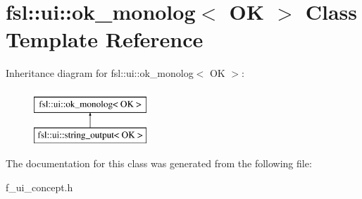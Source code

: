 \hypertarget{classfsl_1_1ui_1_1ok__monolog}{}\section{fsl\+::ui\+::ok\+\_\+monolog$<$ OK $>$ Class Template Reference}
\label{classfsl_1_1ui_1_1ok__monolog}
Inheritance diagram for fsl\+::ui\+::ok\+\_\+monolog$<$ OK $>$\+:\begin{figure}[H]
\begin{center}
\leavevmode
\includegraphics[height=2.000000cm]{classfsl_1_1ui_1_1ok__monolog}
\end{center}
\end{figure}


The documentation for this class was generated from the following file\+:\begin{DoxyCompactItemize}
\item 
f\+\_\+ui\+\_\+concept.\+h\end{DoxyCompactItemize}
